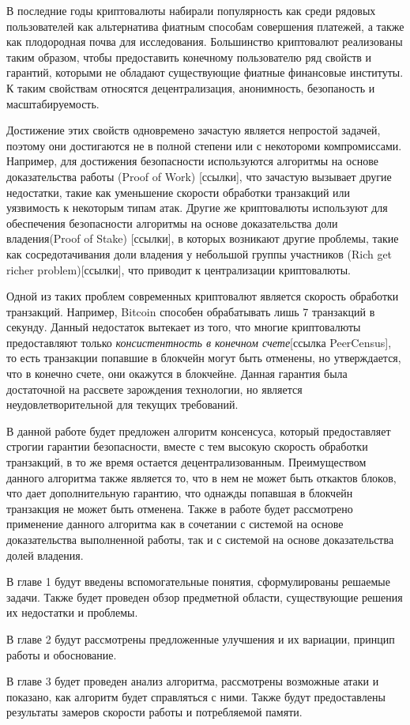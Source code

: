\startprefacepage
В последние годы криптовалюты набирали популярность как среди рядовых пользователей как альтернатива фиатным способам совершения платежей, а также как плодородная почва для исследования.
Большинство криптовалют реализованы таким образом, чтобы предоставить конечному пользователю ряд свойств и гарантий, которыми не обладают существующие фиатные финансовые институты. К таким свойствам относятся децентрализация, анонимность, безопаность и масштабируемость.
 
Достижение этих свойств одновремено зачастую является непростой задачей, 
поэтому они достигаются не в полной степени или с некотороми компромиссами.
Например, для достижения безопасности используются алгоритмы на основе доказательства работы (Proof of Work) [ссылки],
что зачастую вызывает другие недостатки, такие как уменьшение скорости обработки транзакций или уязвимость к некоторым типам атак.
Другие же криптовалюты используют для обеспечения безопасности алгоритмы на основе доказательства доли владения(Proof of Stake) [ссылки], в которых 
возникают другие проблемы, такие как сосредотачивания доли владения у небольшой группы участников (Rich get richer  problem)[ссылки],
что приводит к централизации криптовалюты.

Одной из таких проблем современных криптовалют является скорость обработки транзакций. 
Например, Bitcoin способен обрабатывать лишь 7 транзакций в секунду. Данный недостаток вытекает из того,
что многие криптовалюты предоставляют только \textit{консистентность в конечном счете}[ссылка PeerCensus], то есть транзакции попавшие в блокчейн могут быть отменены, но утверждается, что в конечно счете, они окажутся в блокчейне. Данная гарантия была достаточной на рассвете зарождения технологии,  но является неудовлетворительной для текущих требований.

В данной работе будет предложен алгоритм консенсуса, который предоставляет строгии гарантии безопасности, 
вместе с тем высокую скорость обработки транзакций, в то же время остается децентрализованным.
Преимуществом данного алгоритма также является то, что в нем не может быть откактов блоков,
что дает дополнительную гарантию, что однажды попавшая в блокчейн транзакция не может быть отменена.
Также в работе будет рассмотрено применение данного алгоритма как в сочетании с системой на основе доказательства выполненной работы,
так и с системой на основе доказательства долей владения.

В главе 1 будут введены вспомогательные понятия, сформулированы решаемые задачи.
Также будет проведен обзор предметной области, существующие решения их недостатки и проблемы.

В главе 2 будут рассмотрены предложенные улучшения и их вариации, принцип работы и обоснование.

В главе 3 будет проведен анализ алгоритма, рассмотрены возможные атаки и показано, как алгоритм будет справляться с ними.
Также будут предоставлены результаты замеров скорости работы и потребляемой памяти.